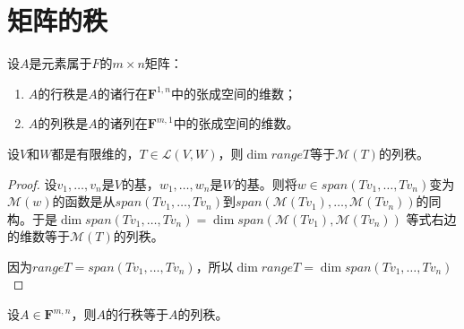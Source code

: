 \documentclass[10pt,a4paper,UTF8]{article}
\begin{document}
\section{矩阵的秩}
\label{sec:org1dbac4b}


\begin{definition}
设\(A\)是元素属于\(F\)的\(m\times n\)矩阵：
\begin{enumerate}
\item \(A\)的行秩是\(A\)的诸行在\(\mathbf{F}^{1,n}\)中的张成空间的维数；
\item \(A\)的列秩是\(A\)的诸列在\(\mathbf{F}^{m,1}\)中的张成空间的维数。
\end{enumerate}
\end{definition}

\begin{theorem}
设\(V\)和\(W\)都是有限维的，\(T\in \mathcal{L}(V,W)\)，则\(\dim range T\)等于\(\mathcal{M}(T)\)的列秩。
\end{theorem}

\begin{proof}
设\(v_{1},\ldots ,v_{n}\)是\(V\)的基，\(w_{1},\ldots ,w_{n}\)是\(W\)的基。则将\(w\in span(Tv_{1},\ldots ,Tv_{n})\)变为\(\mathcal{M}(w)\)的函数是从\(span(Tv_{1},\ldots ,Tv_{n})\)到\(span(\mathcal{M}(Tv_{1}), \ldots ,\mathcal{M}(Tv_{n}))\)的同构。于是\(\dim span(Tv_{1},\ldots ,Tv_{n}) = \dim span(\mathcal{M}(Tv_{1}), \mathcal{M}(Tv_{n}))\) 等式右边的维数等于\(\mathcal{M}(T)\)的列秩。

因为\(rangeT = span(Tv_{1},\ldots ,Tv_{n})\)，所以\(\dim rangeT = \dim span(Tv_{1},\ldots ,Tv_{n})\)
\end{proof}
\begin{theorem}
设\(A \in \mathbf{F}^{m,n}\)，则\(A\)的行秩等于\(A\)的列秩。
\end{theorem}
\end{document}
